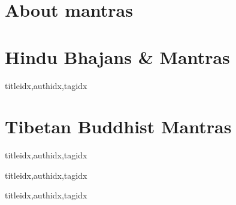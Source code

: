 
  \setcounter{chapter}{0} %

    \section{About mantras}
      
    \clearpage\scleardpage
    \section{Hindu Bhajans \& Mantras}
      \begin{songs}{titleidx,authidx,tagidx}
        \setcounter{songnum}{100}
        
      \end{songs}
    \scleardpage
    \section{Tibetan Buddhist Mantras}
      \begin{songs}{titleidx,authidx,tagidx}
        \setcounter{songnum}{150}
        
      \end{songs}

    \begin{songs}{titleidx,authidx,tagidx}
      \setcounter{songnum}{200}
      
    \end{songs}

    \begin{songs}{titleidx,authidx,tagidx}
      \setcounter{songnum}{300}
      
    \end{songs}


